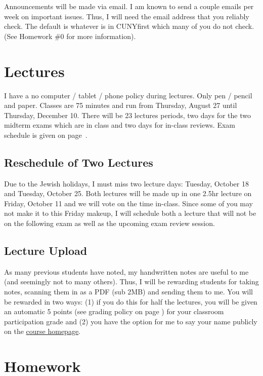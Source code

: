 \documentclass[12pt]{article}
\newcommand{\coursewebpage}{\href{https://github.com/kapelner/QC_Math_241_Fall_2016}{course homepage}}
\begin{document}
Announcements will be made via email. I am known to send a couple emails per week on important issues. Thus, I will need the email address that you reliably check. The default is whatever is in CUNYfirst which many of you do not check. (See Homework \#0 for more information).

\section*{Lectures}

I have a no computer / tablet / phone policy during lectures. Only pen / pencil and paper. Classes are 75 minutes and run from Thursday, August 27 until Thursday, December 10. There will be 23 lectures periods, two days for the two midterm exams which are in class and two days for in-class reviews. Exam schedule is given on page~\pageref{subsec:exam_schedule}.

\subsection*{Reschedule of Two Lectures}

Due to the Jewish holidays, I must miss two lecture days: Tuesday, October 18 and Tuesday, October 25. Both lectures will be made up in one 2.5hr lecture on Friday, October 11 and we will vote on the time in-class. Since some of you may not make it to this Friday makeup, I will schedule both a lecture that will not be on the following exam as well as the upcoming exam review session.

\subsection*{Lecture Upload}

As many previous students have noted, my handwritten notes are useful to me (and seemingly not to many others). Thus, I will be rewarding students for taking notes, scanning them in as a PDF (sub 2MB) and sending them to me. You will be rewarded in two ways: (1) if you do this for half the lectures, you will be given an automatic 5 points (see grading policy on page \pageref{sec:grading}) for your classroom participation grade and (2) you have the option for me to say your name publicly on the \coursewebpage.

\section*{Homework}
\end{document}
